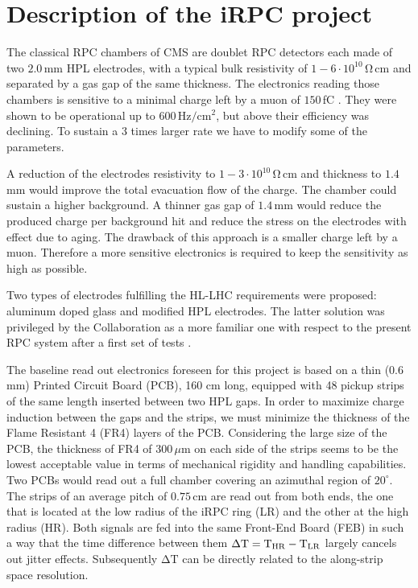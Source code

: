 \documentclass{PoS}
\newcommand{\hzcm}{\mathrm{Hz/cm^2}}
\newcommand{\ohmcm}{\mathrm{\Omega\,cm}}
\newcommand{\DT}{\mathrm{\Delta T}}
\begin{document}
\section{Description of the iRPC project}

The classical RPC chambers of CMS are doublet RPC detectors each made of two $2.0$\,mm HPL electrodes, with a typical bulk resistivity of $1-6 \cdot 10^{10}\,\ohmcm$ and separated by a gas gap of the same thickness. The electronics reading those chambers is sensitive to a minimal charge left by a muon of $150$\,fC \cite{Chatrchyan:2008zzk}.
They were shown to be operational up to 600\,$\hzcm$, but above their efficiency was declining. To sustain a 3 times larger rate we have to modify some of the parameters.

A reduction of the electrodes resistivity to $1-3 \cdot 10^{10}\,\ohmcm$ and thickness to $1.4$\,mm would improve the total evacuation flow of the charge. The chamber could sustain a higher background. A thinner gas gap of $1.4$\,mm would reduce the produced charge per background hit and reduce the stress on the electrodes with effect due to aging. The drawback of this approach is a smaller charge left by a muon. Therefore a more sensitive electronics is required to keep the sensitivity as high as possible.

Two types of electrodes fulfilling the HL-LHC requirements were proposed: aluminum doped glass \cite{Gouzevitch:2016pcr} and modified HPL electrodes. The latter solution was privileged by the Collaboration as a more familiar one with respect to the present RPC system after a first set of tests \cite{upgrade}.

The baseline read out electronics foreseen for this project is based on a thin ($0.6$\,mm) Printed Circuit Board (PCB), 160 cm long, equipped with 48 pickup strips of the same length inserted between two HPL gaps. In order to maximize charge induction between the gaps and the strips, we must minimize the thickness of the Flame Resistant 4 (FR4) layers of the PCB. Considering the large size of the PCB, the thickness of FR4 of $300$\,$\mu$m on each side of the strips seems to be the lowest acceptable value in terms of mechanical rigidity and handling capabilities.
Two PCBs would read out a full chamber covering an azimuthal region of $20^{\circ}$. The strips of an average pitch of $0.75$\,cm are read out from both ends, the one that is located at the low radius of the iRPC ring (LR) and the other at the high radius (HR). Both signals are fed into the same Front-End Board (FEB) in such a way that the time difference between them $\DT = {\rm T}_{\rm HR} - {\rm T}_{\rm LR}$ largely cancels out jitter effects. Subsequently $\DT$ can be directly related to the along-strip space resolution. 
\end{document}

